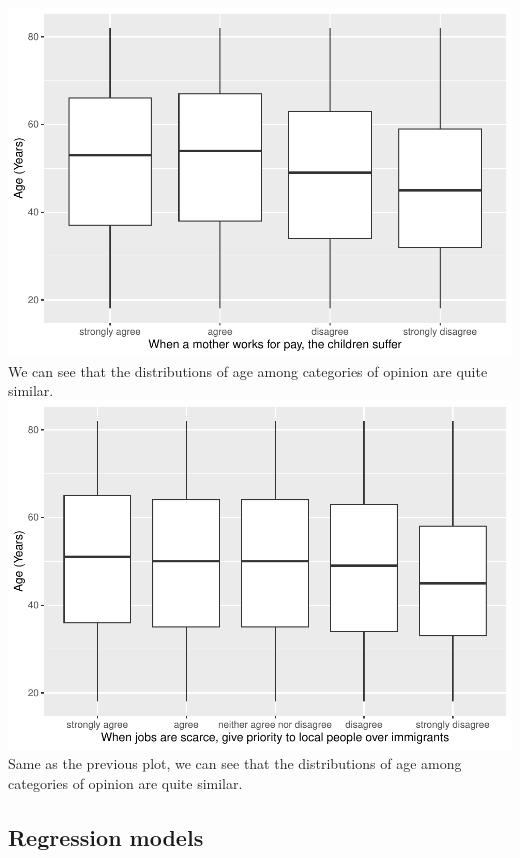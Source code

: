 \documentclass[
]{article}
\begin{document}
\includegraphics{Report-for-policy-makers_files/figure-latex/plot_v72-1.pdf}
We can see that the distributions of age among categories of opinion are
quite similar.\\

\includegraphics{Report-for-policy-makers_files/figure-latex/plot_v80-1.pdf}
Same as the previous plot, we can see that the distributions of age
among categories of opinion are quite similar.

\hypertarget{regression-models}{%
\subsection{Regression models}\label{regression-models}}
\end{document}
